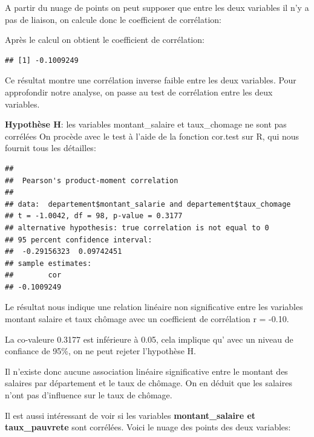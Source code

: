 \documentclass[mstat,12pt]{unswthesis}
\begin{document}
A partir du nuage de points on peut supposer que entre les deux
variables il n'y a pas de liaison, on calcule donc le coefficient de
corrélation: \medskip 

Après le calcul on obtient le coefficient de corrélation:

\medskip

\begin{verbatim}
## [1] -0.1009249
\end{verbatim}

\medskip

Ce résultat montre une corrélation inverse faible entre les deux
variables. Pour approfondir notre analyse, on passe au test de
corrélation entre les deux variables.

\medskip

\textbf{Hypothèse H}: les variables montant\_salaire et taux\_chomage ne
sont pas corrélées On procède avec le test à l'aide de la fonction
cor.test sur R, qui nous fournit tous les détailles:

\medskip

\begin{verbatim}
## 
##  Pearson's product-moment correlation
## 
## data:  departement$montant_salarie and departement$taux_chomage
## t = -1.0042, df = 98, p-value = 0.3177
## alternative hypothesis: true correlation is not equal to 0
## 95 percent confidence interval:
##  -0.29156323  0.09742451
## sample estimates:
##        cor 
## -0.1009249
\end{verbatim}

\medskip

Le résultat nous indique une relation linéaire non significative entre
les variables montant salaire et taux chômage avec un coefficient de
corrélation r = -0.10.

\medskip

La co-valeure 0.3177 est inférieure à 0.05, cela implique qu' avec un
niveau de confiance de 95\%, on ne peut rejeter l'hypothèse H.

\medskip

Il n'existe donc aucune association linéaire significative entre le
montant des salaires par département et le taux de chômage. On en déduit
que les salaires n'ont pas d'influence sur le taux de chômage.

\bigskip

Il est aussi intéressant de voir si les variables
\textbf{montant\_salaire et taux\_pauvrete} sont corrélées. Voici le
nuage des points des deux variables:
\end{document}
